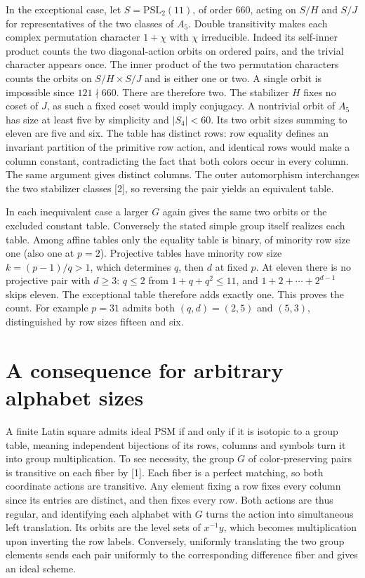 \documentclass[11pt]{article}
\begin{document}
In the exceptional case, let $S=\mathrm{PSL}_2(11)$, of order $660$, acting on $S/H$ and $S/J$ for representatives of the two classes of $A_5$. Double transitivity makes each complex permutation character $1+\chi$ with $\chi$ irreducible. Indeed its self-inner product counts the two diagonal-action orbits on ordered pairs, and the trivial character appears once. The inner product of the two permutation characters counts the orbits on $S/H\times S/J$ and is either one or two. A single orbit is impossible since $121\nmid660$. There are therefore two. The stabilizer $H$ fixes no coset of $J$, as such a fixed coset would imply conjugacy. A nontrivial orbit of $A_5$ has size at least five by simplicity and $|S_4|<60$. Its two orbit sizes summing to eleven are five and six. The table has distinct rows: row equality defines an invariant partition of the primitive row action, and identical rows would make a column constant, contradicting the fact that both colors occur in every column. The same argument gives distinct columns. The outer automorphism interchanges the two stabilizer classes [2], so reversing the pair yields an equivalent table.

In each inequivalent case a larger $G$ again gives the same two orbits or the excluded constant table. Conversely the stated simple group itself realizes each table. Among affine tables only the equality table is binary, of minority row size one (also one at $p=2$). Projective tables have minority row size $k=(p-1)/q>1$, which determines $q$, then $d$ at fixed $p$. At eleven there is no projective pair with $d\ge3$: $q\le2$ from $1+q+q^2\le11$, and $1+2+\cdots+2^{d-1}$ skips eleven. The exceptional table therefore adds exactly one. This proves the count. For example $p=31$ admits both $(q,d)=(2,5)$ and $(5,3)$, distinguished by row sizes fifteen and six.

\section{A consequence for arbitrary alphabet sizes}
A finite Latin square admits ideal PSM if and only if it is isotopic to a group table, meaning independent bijections of its rows, columns and symbols turn it into group multiplication. To see necessity, the group $G$ of color-preserving pairs is transitive on each fiber by [1]. Each fiber is a perfect matching, so both coordinate actions are transitive. Any element fixing a row fixes every column since its entries are distinct, and then fixes every row. Both actions are thus regular, and identifying each alphabet with $G$ turns the action into simultaneous left translation. Its orbits are the level sets of $x^{-1}y$, which becomes multiplication upon inverting the row labels. Conversely, uniformly translating the two group elements sends each pair uniformly to the corresponding difference fiber and gives an ideal scheme.
\end{document}
